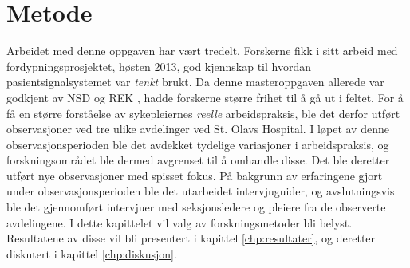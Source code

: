 \chapter{Metode}
\label{chp:metode} 

Arbeidet med denne oppgaven har vært tredelt. Forskerne fikk i sitt arbeid med fordypningsprosjektet, høsten 2013, god kjennskap til hvordan pasientsignalsystemet var \textit{tenkt} brukt. Da denne masteroppgaven allerede var godkjent av NSD \citep{NSD} og REK \citep{REK}, hadde forskerne større frihet til å gå ut i feltet. For å få en større forståelse av sykepleiernes \textit{reelle} arbeidspraksis, ble det derfor utført observasjoner ved tre ulike avdelinger ved St. Olavs Hospital. I løpet av denne observasjonsperioden ble det avdekket tydelige variasjoner i arbeidspraksis, og forskningsområdet ble dermed avgrenset til å omhandle disse. Det ble deretter utført nye observasjoner med spisset fokus. På bakgrunn av erfaringene gjort under observasjonsperioden ble det utarbeidet intervjuguider, og avslutningsvis ble det gjennomført intervjuer med seksjonsledere og pleiere fra de observerte avdelingene. I dette kapittelet vil valg av forskningsmetoder bli belyst. Resultatene av disse vil bli presentert i kapittel \ref{chp:resultater}, og deretter diskutert i kapittel \ref{chp:diskusjon}.





